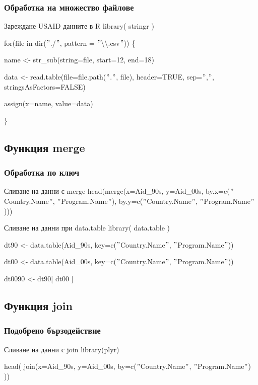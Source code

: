 \documentclass{beamer}
\begin{document}
\begin{frame}
\frametitle{Обработка на множество файлове}
\begin{block}{Зареждане USAID данните в R}
library( stringr )

for(file in dir($"$./$"$, pattern = $"$\textbackslash\textbackslash .csv$"$)) \{

	name <- str\_sub(string=file, start=12, end=18)

	data <- read.table(file=file.path($"$.$"$, file), header=TRUE, sep=$"$,$"$, stringsAsFactors=FALSE)

	assign(x=name, value=data)
	
\}
\end{block}
\end{frame}

\subsection{Функция merge}

\begin{frame}
\frametitle{Обработка по ключ}
\begin{block}{Сливане на данни с merge}
head(merge(x=Aid\_90s, y=Aid\_00s, by.x=c($"$Country.Name$"$, $"$Program.Name$"$), by.y=c($"$Country.Name$"$, $"$Program.Name$"$)))
\end{block}

\begin{block}{Сливане на данни при data.table}
library( data.table )

dt90 <- data.table(Aid\_90s, key=c($"$Country.Name$"$, $"$Program.Name$"$))

dt00 <- data.table(Aid\_00s, key=c($"$Country.Name$"$, $"$Program.Name$"$))

dt0090 <- dt90[ dt00 ]
\end{block}
\end{frame}

\subsection{Функция join}

\begin{frame}
\frametitle{Подобрено бързодействие}
\begin{block}{Сливане на данни с join}
library(plyr)

head( join(x=Aid\_90s, y=Aid\_00s, by=c($"$Country.Name$"$, $"$Program.Name$"$) ))
\end{block}
\end{frame}
\end{document}
